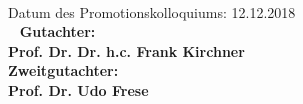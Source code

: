 ~
\vspace{17cm}
\textbf{}\\
Datum des Promotionskolloquiums:  12.12.2018\\ ~
\vspace{1cm}\newline
\textbf{Gutachter:}\\
\textbf{\normalsize{Prof. Dr. Dr. h.c. Frank Kirchner}}\\[2ex]
\textbf{Zweitgutachter:}\\
\textbf{\normalsize{Prof. Dr. Udo Frese}}\\
\textbf{\normalsize{}}\\
